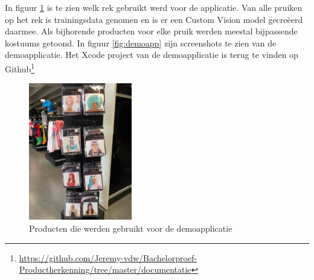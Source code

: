 In figuur \ref{fig:rek} is te zien welk rek gebruikt werd voor de applicatie. Van alle pruiken op het rek is trainingsdata genomen en is er een Custom Vision model gecreëerd daarmee.  Als bijhorende producten voor elke pruik werden meestal bijpassende kostuums getoond. In figuur \ref{fig:demoapp} zijn screenshots te zien van de demoapplicatie. Het Xcode project van de demoapplicatie is terug te vinden op Github\footnote{\url{https://github.com/Jeremy-vdw/Bachelorproef-Productherkenning/tree/master/documentatie}}
\begin{figure}[h!]
    \centering
        \includegraphics[width=0.4\textwidth]{img/rek.jpg}
    \caption{Producten die werden gebruikt voor de demoapplicatie}
    \label{fig:rek}
  \end{figure}

